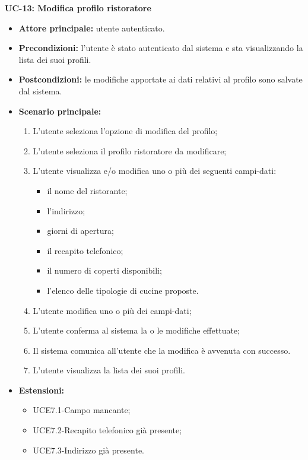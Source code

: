 \textbf{UC-13: Modifica profilo ristoratore}
\begin{itemize}
\item \textbf{Attore principale:} utente autenticato.
\item \textbf{Precondizioni:} l'utente è stato autenticato dal sistema e sta visualizzando la lista dei suoi profili.
\item \textbf{Postcondizioni:} le modifiche apportate ai dati relativi al profilo sono salvate dal sistema.
\item \textbf{Scenario principale:}
\begin{enumerate}
    \item L'utente seleziona l'opzione di modifica del profilo;
    \item L'utente seleziona il profilo ristoratore da modificare;
    \item L'utente visualizza e/o modifica uno o più dei seguenti campi-dati:
        \begin{itemize}
            \item il nome del ristorante;
            \item l'indirizzo;
            \item giorni di apertura;
            \item il recapito telefonico;
            \item il numero di coperti disponibili;
            \item l'elenco delle tipologie di cucine proposte.
        \end{itemize}
    \item L'utente modifica uno o più dei campi-dati;
    \item L'utente conferma al sistema la o le modifiche effettuate;
    \item Il sistema comunica all'utente che la modifica è avvenuta con successo.
    \item L'utente visualizza la lista dei suoi profili.
\end{enumerate}
        \item \textbf{Estensioni:}
        \begin{itemize}
                \item UCE7.1-Campo mancante;
                \item UCE7.2-Recapito telefonico già presente;
                \item UCE7.3-Indirizzo già presente.
        \end{itemize}
\end{itemize}

